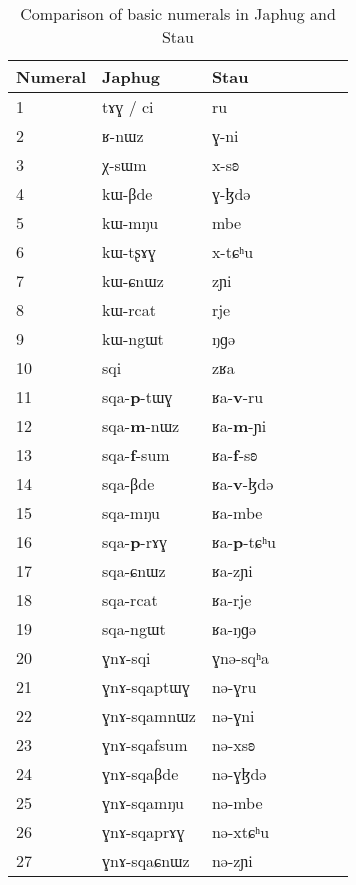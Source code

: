 \documentclass[oldfontcommands,oneside,a4paper,12pt]{article}
\newcommand{\ipa}[1]{{\phon#1}}
\newcommand{\grise}[1]{\cellcolor{lightgray}\textbf{#1}}
\begin{document}
\begin{table}[h]
\caption{Comparison of basic numerals in Japhug and Stau}  \label{tab:num.simple} \centering
\begin{tabular}{lllllll}
\toprule
Numeral & Japhug & Stau \\
\midrule
1	&	\ipa{tɤɣ} / \ipa{ci} &	\ipa{ru}  &	\\
2	&	\ipa{ʁ-nɯz}  &	\ipa{ɣ-ni}  &	\\
3	&	\ipa{χ-sɯm}  &	\ipa{x-sʚ}  &	\\
4	&	\ipa{kɯ-βde}  &	\ipa{ɣ-ɮdə}  &	\\
5	&	\ipa{kɯ-mŋu}  &	\ipa{mbe}  &	\\
6	&	\ipa{kɯ-tʂɤɣ}  &	\ipa{x-tɕʰu}  &	\\
7	&	\ipa{kɯ-ɕnɯz}  &	\ipa{zɲi}  &	\\
8	&	\ipa{kɯ-rcat}  &	\ipa{rje}  &	\\
9	&	\ipa{kɯ-ngɯt}  &	\ipa{ŋɡə}  &	\\
10	&	\ipa{sqi}  &	\ipa{zʁa}  &	\\
\midrule
11	&	\ipa{sqa-\textbf{p}-tɯɣ} \grise &	\ipa{ʁa-\textbf{v}-ru}  \grise&	\\
12	&	\ipa{sqa-\textbf{m}-nɯz} \grise &	\ipa{ʁa-\textbf{m}-ɲi}  \grise&	\\
13	&	\ipa{sqa-\textbf{f}-sum}  \grise&	\ipa{ʁa-\textbf{f}-sʚ} \grise &	\\
14	&	\ipa{sqa-βde}  &	\ipa{ʁa-\textbf{v}-ɮdə}  \grise&	\\
15	&	\ipa{sqa-mŋu}  &	\ipa{ʁa-mbe}  &	\\
16	&	\ipa{sqa-\textbf{p}-rɤɣ}  \grise&	\ipa{ʁa-\textbf{p}-tɕʰu}  \grise&	\\
17	&	\ipa{sqa-ɕnɯz}  &	\ipa{ʁa-zɲi}  &	\\
18	&	\ipa{sqa-rcat}  &	\ipa{ʁa-rje}  &	\\
19	&	\ipa{sqa-ngɯt}  &	\ipa{ʁa-ŋɡə}  &	\\
20	&	\ipa{ɣnɤ-sqi}  &	\ipa{ɣnə-sqʰa}  &	\\
\midrule
21	&	\ipa{ɣnɤ-sqaptɯɣ}  &	\ipa{nə-ɣru}  &	\\	
22	&	\ipa{ɣnɤ-sqamnɯz}  &	\ipa{nə-ɣni}  &	\\	
23	&	\ipa{ɣnɤ-sqafsum}  &	\ipa{nə-xsʚ}  &	\\	
24	&	\ipa{ɣnɤ-sqaβde}  &	\ipa{nə-ɣɮdə}  &	\\	
25	&	\ipa{ɣnɤ-sqamŋu}  &	\ipa{nə-mbe}  &	\\	
26	&	\ipa{ɣnɤ-sqaprɤɣ}  &	\ipa{nə-xtɕʰu}  &	\\	
27	&	\ipa{ɣnɤ-sqaɕnɯz}  &	\ipa{nə-zɲi}  &	\\	

\end{tabular}
\end{table}
\end{document}
